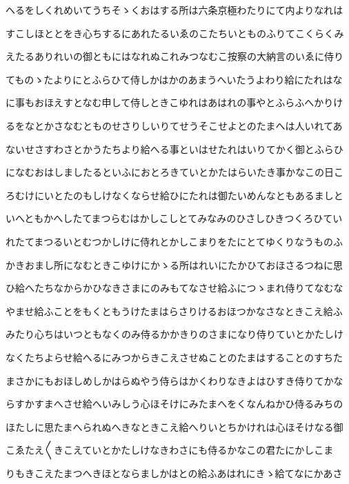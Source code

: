 \documentclass[a4paper,11pt,landscape]{ltjtarticle}
\begin{document}
へるをしくれめいてうちそゝくおはする所は六条京極わたりにて内よりなれは
\par\medskip
すこしほととをき心ちするにあれたるいゑのこたちいとものふりてこくらくみ
\par\medskip
えたるありれいの御ともにはなれぬこれみつなむこ按察の大納言のいゑに侍り
\par\medskip
てものゝたよりにとふらひて侍しかはかのあまうへいたうよわり給にたれはな
\par\medskip
に事もおほえすとなむ申して侍しときこゆれはあはれの事やとふらふへかりけ
\par\medskip
るをなとかさなむとものせさりしいりてせうそこせよとのたまへは人いれてあ
\par\medskip
ないせさすわさとかうたちより給へる事といはせたれはいりてかく御とふらひ
\par\medskip
になむおはしましたるといふにおとろきていとかたはらいたき事かなこの日こ
\par\medskip
ろむけにいとたのもしけなくならせ給ひにたれは御たいめんなともあるましと
\par\medskip
いへともかへしたてまつらむはかしこしとてみなみのひさしひきつくろひてい
\par\medskip
れたてまつるいとむつかしけに侍れとかしこまりをたにとてゆくりなうものふ
\par\medskip
かきおまし所になむときこゆけにかゝる所はれいにたかひておほさるつねに思
\par\medskip
ひ給へたちなからかひなきさまにのみもてなさせ給ふにつゝまれ侍りてなむな
\par\medskip
やませ給ふことをもくともうけたまはらさりけるおほつかなさなときこえ給ふ
\par\medskip
みたり心ちはいつともなくのみ侍るかかきりのさまになり侍りていとかたしけ
\par\medskip
なくたちよらせ給へるにみつからきこえさせぬことのたまはすることのすちた
\par\medskip
まさかにもおほしめしかはらぬやう侍らはかくわりなきよはひすき侍りてかな
\par\medskip
らすかすまへさせ給へいみしう心ほそけにみたまへをくなんねかひ侍るみちの
\par\medskip
ほたしに思たまへられぬへきなときこえ給へりいとちかけれは心ほそけなる御
\par\medskip
こゑたえ〱きこえていとかたしけなきわさにも侍るかなこの君たにかしこま
\par\medskip
りもきこえたまつへきほとならましかはとの給ふあはれにきゝ給てなにかあさ
\par\medskip
\end{document}
